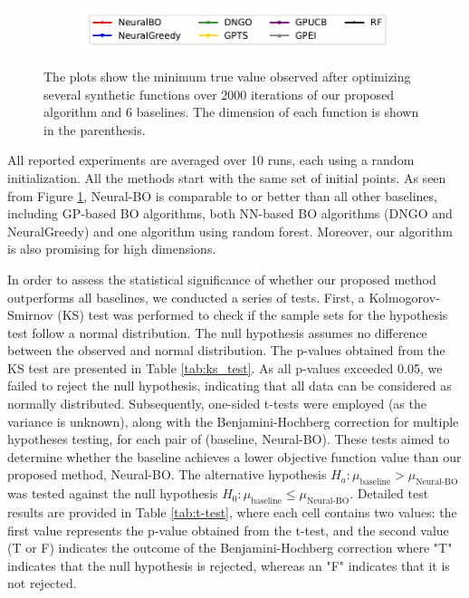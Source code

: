 \begin{figure}[]
\begin{subfigure}[b]{\textwidth}
    \end{subfigure}
    \begin{subfigure}[b]{0.8\textwidth}
        \centering
        \includegraphics[width=\textwidth]{Figures/Neural-BO/baselines.pdf}
    \end{subfigure}
    \caption{The plots show the minimum true value observed after optimizing several synthetic functions over 2000 iterations of our proposed algorithm and 6 baselines. The dimension of each function is shown in the parenthesis.}
    \label{fig:neural-bo_synthetic}
\end{figure}




All reported experiments are averaged over 10 runs, each using a random initialization. All the methods start with the same set of initial points. As seen from Figure \ref{fig:neural-bo_synthetic}, Neural-BO is comparable to or better than all other baselines, including GP-based BO algorithms, both NN-based BO algorithms (DNGO and NeuralGreedy) and one algorithm using random forest. Moreover, our algorithm is also promising for high dimensions. 



In order to assess the statistical significance of whether our proposed method outperforms all baselines, we conducted a series of tests. First, a Kolmogorov-Smirnov (KS) test was performed to check if the sample sets for the hypothesis test follow a normal distribution. The null hypothesis assumes no difference between the observed and normal distribution. The p-values obtained from the KS test are presented in Table \ref{tab:ks_test}.  As all p-values exceeded 0.05, we failed to reject the null hypothesis, indicating that all data can be considered as normally distributed. Subsequently, one-sided t-tests were employed (as the variance is unknown), along with the Benjamini-Hochberg correction for multiple hypotheses testing, for each pair of (baseline, Neural-BO). These tests aimed to determine whether the baseline achieves a lower objective function value than our proposed method, Neural-BO. The alternative hypothesis $H_a: \mu_\text{baseline} > \mu_{\text{Neural-BO}}$ was tested against the null hypothesis $H_0: \mu_\text{baseline} \le \mu_{\text{Neural-BO}}$. Detailed test results are provided in Table \ref{tab:t-test}, where each cell contains two values: the first value represents the p-value obtained from the t-test, and the second value (T or F) indicates the outcome of the Benjamini-Hochberg correction where "T" indicates that the null hypothesis is rejected, whereas an "F" indicates that it is not rejected.







